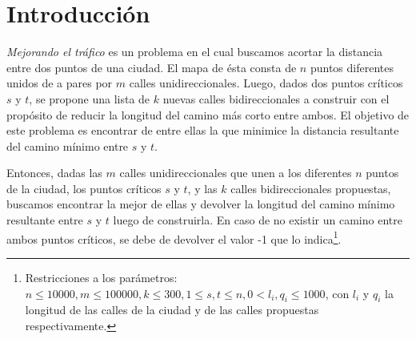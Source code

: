 \section{Introducción}

\textit{Mejorando el tráfico} es un problema en el cual buscamos acortar la distancia entre dos puntos de una ciudad. El mapa de ésta consta de $n$ puntos diferentes unidos de a pares por $m$ calles unidireccionales. Luego, dados dos puntos críticos $s$ y $t$, se propone una lista de $k$ nuevas calles bidireccionales a construir con el propósito de reducir la longitud del camino más corto entre ambos. El objetivo de este problema es encontrar de entre ellas la que minimice la distancia resultante del camino mínimo entre $s$ y $t$.

\vspace{1em}

Entonces, dadas las $m$ calles unidireccionales que unen a los diferentes $n$ puntos de la ciudad, los puntos críticos $s$ y $t$, y las $k$ calles bidireccionales propuestas, buscamos encontrar la mejor de ellas y devolver la longitud del camino mínimo resultante entre $s$ y $t$ luego de construirla. En caso de no existir un camino entre ambos puntos críticos, se debe de devolver el valor -1 que lo indica\footnote{Restricciones a los parámetros: \\ \indent \indent $n \leq 10000, m \leq 100000, k \leq 300, 1 \leq s, t \leq n, 0 < l_i, q_i \leq 1000$, con $l_i$ y $q_i$ la longitud de las calles de la ciudad \indent \indent y de las calles propuestas respectivamente.}.

\vspace{1em}